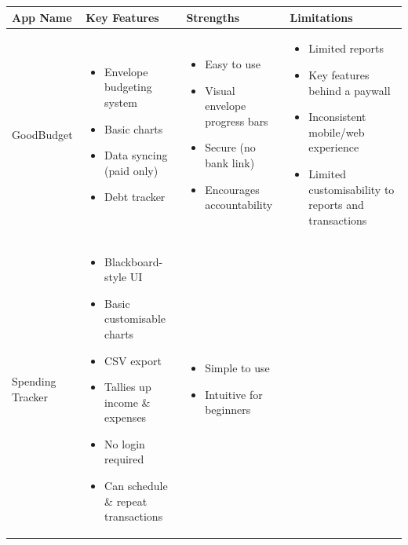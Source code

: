 \documentclass{l4proj}
\begin{document}
\begin{tabular}{|p{3cm}|p{3.5cm}|p{3.5cm}|p{3.5cm}|}
    \hline
    \textbf{App Name} & \textbf{Key Features} & \textbf{Strengths} & \textbf{Limitations} \\
    \hline
    GoodBudget & 
    \begin{itemize}[noitemsep, topsep=0pt, left=0pt]
        \item Envelope budgeting system
        \item Basic charts
        \item Data syncing (paid only)
        \item Debt tracker
    \end{itemize} &
    \begin{itemize}[noitemsep, topsep=0pt, left=0pt]
        \item Easy to use
        \item Visual envelope progress bars
        \item Secure (no bank link)
        \item Encourages accountability
    \end{itemize} &
    \begin{itemize}[noitemsep, topsep=0pt, left=0pt]
        \item Limited reports
        \item Key features behind a paywall
        \item Inconsistent mobile/web experience
        \item Limited customisability to reports and transactions
    \end{itemize} \\
    \hline
    Spending Tracker &
    \begin{itemize}[noitemsep, topsep=0pt, left=0pt]
        \item Blackboard-style UI
        \item Basic customisable charts
        \item CSV export
        \item Tallies up income \& expenses
        \item No login required
        \item Can schedule \& repeat transactions
    \end{itemize} &
    \begin{itemize}[noitemsep, topsep=0pt, left=0pt]
        \item Simple to use
        \item Intuitive for beginners

\end{itemize}
\end{tabular}
\end{document}
